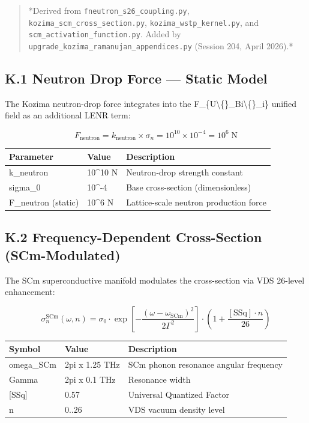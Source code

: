 \documentclass[11pt]{article}
\begin{document}
\begin{quote}
*Derived from \verb|fneutron_s26_coupling.py|, \verb|kozima_scm_cross_section.py|,
\verb|kozima_wstp_kernel.py|, and \verb|scm_activation_function.py|. Added by
\verb|upgrade_kozima_ramanujan_appendices.py| (Session 204, April 2026).*
\end{quote}

\subsection*{K.1 Neutron Drop Force --- Static Model}

The Kozima neutron-drop force integrates into the F\_\{U\textbackslash\{\}\_Bi\textbackslash\{\}\_i\} unified field as an additional LENR term:

$$F_{\mathrm{neutron}} = k_{\mathrm{neutron}} \times \sigma_n = 10^{10} \times 10^{-4} = 10^6 \;\text{N}$$

\begin{center}
\begin{longtable}{lll}
\toprule
Parameter & Value & Description \tabularnewline
\midrule
\endhead
k\_neutron & 10\textasciicircum{}10 N & Neutron-drop strength constant \tabularnewline
sigma\_0 & 10\textasciicircum{}-4 & Base cross-section (dimensionless) \tabularnewline
F\_neutron (static) & 10\textasciicircum{}6 N & Lattice-scale neutron production force \tabularnewline
\bottomrule
\end{longtable}
\end{center}

\subsection*{K.2 Frequency-Dependent Cross-Section (SCm-Modulated)}

The SCm superconductive manifold modulates the cross-section via VDS 26-level enhancement:

$$\sigma_n^{\mathrm{SCm}}(\omega, n) = \sigma_0 \cdot \exp\!\left[-\frac{(\omega - \omega_{\mathrm{SCm}})^2}{2\Gamma^2}\right] \cdot \left(1 + \frac{[\text{SSq}] \cdot n}{26}\right)$$

\begin{center}
\begin{longtable}{lll}
\toprule
Symbol & Value & Description \tabularnewline
\midrule
\endhead
omega\_SCm & 2pi x 1.25 THz & SCm phonon resonance angular frequency \tabularnewline
Gamma & 2pi x 0.1 THz & Resonance width \tabularnewline
{}[SSq] & 0.57 & Universal Quantized Factor \tabularnewline
n & 0..26 & VDS vacuum density level \tabularnewline
\bottomrule
\end{longtable}
\end{center}
\end{document}
